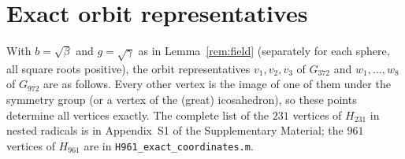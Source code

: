 \documentclass[11pt]{article}
\theoremstyle{remark}
\begin{document}



\appendix
\section{Exact orbit representatives}\label{app:reps}

With $b=\sqrt\beta$ and $g=\sqrt\gamma$ as in Lemma~\ref{rem:field} (separately for each sphere, all
square roots positive), the orbit representatives $v_1,v_2,v_3$ of $G_{372}$ and $w_1,\dots,w_8$ of $G_{972}$ are as follows.
Every other vertex is the image of one of them under the symmetry group (or a vertex of the (great)
icosahedron), so these points determine all vertices exactly. The complete list of the $231$ vertices of
$H_{231}$ in nested radicals is in Appendix~S1 of the Supplementary Material; the $961$ vertices of $H_{961}$ are in
\texttt{H961\_exact\_coordinates.m}.
\end{document}
